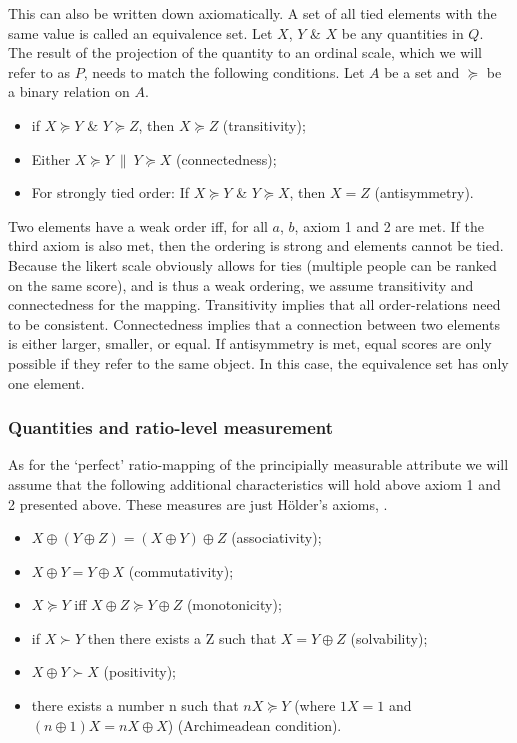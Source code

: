 \documentclass[utf8]{FrontiersinVancouver}
\begin{document}
This can also be written down axiomatically. A set of all tied elements with the same value is called an equivalence set. Let $X$, $Y$ \& $X$ be any quantities in $Q$. The result of the projection of the quantity to an ordinal scale, which we will refer to as $P$, needs to match the following conditions. Let $A$ be a set and $\succeq$ be a binary relation on $A$. 

\begin{itemize}
    \item if $X \succeq Y$ \& $Y \succeq Z$, then $X \succeq Z$ (transitivity);
    \item Either $X \succeq Y\ \|\ Y \succeq X$ (connectedness);
    \item For strongly tied order: If $X \succeq Y$ \& $Y \succeq X$, then $X = Z$ (antisymmetry).
\end{itemize}

Two elements have a weak order iff, for all $a$, $b$, axiom 1 and 2 are met.  If the third axiom is also met, then the ordering is strong and elements cannot be tied. Because the likert scale obviously allows for ties (multiple people can be ranked on the same score), and is thus a weak ordering, we assume transitivity and connectedness for the mapping. Transitivity implies that all order-relations need to be consistent. Connectedness implies that a connection between two elements is either larger, smaller, or equal. If antisymmetry is met, equal scores are only possible if they refer to the same object. In this case, the equivalence set has only one element.

\subsubsection{Quantities and ratio-level measurement}
As for the `perfect' ratio-mapping of the principially measurable attribute we will assume that the following additional characteristics will hold above axiom 1 and 2 presented above. These measures are just Hölder's axioms,  \citep{krantzFoundationsMeasurement1971}. 

\begin{itemize}
    \item $X \oplus (Y \oplus Z) = (X \oplus Y) \oplus Z$ (associativity);
    \item $X \oplus Y = Y \oplus X$ (commutativity);
    \item $X \succeq Y$ iff $X \oplus Z \succeq Y \oplus Z$ (monotonicity);
    \item if $X \succ Y$ then there exists a Z such that $X = Y \oplus Z$ (solvability);
    \item $X \oplus Y \succ X$ (positivity);
    \item there exists a number n such that $nX \succeq Y$ (where $1X = 1$ and $(n \oplus 1) X = nX \oplus X$) (Archimeadean condition).
\end{itemize}
\end{document}
